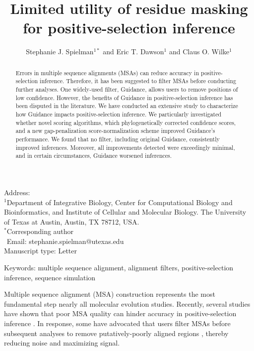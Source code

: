 \documentclass[11pt]{article}
\begin{document}
\title{\textbf{Limited utility of residue masking for positive-selection inference}}
\author{Stephanie J. Spielman$^{1*}$ and Eric T. Dawson$^{1}$ and Claus O. Wilke$^{1}$}
\date{}

\maketitle
\noindent
Address:\\
$^1$Department of Integrative Biology, Center for Computational Biology and Bioinformatics, and Institute of Cellular and Molecular Biology.
The University of Texas at Austin, Austin, TX 78712, USA.\\

\bigskip
\noindent
$^*$Corresponding author\\
$\phantom{^*}$Email: stephanie.spielman@utexas.edu\\

\bigskip
\noindent
Manuscript type: Letter

\bigskip
\noindent Keywords: multiple sequence alignment, alignment filters, positive-selection inference, sequence simulation

\newpage
\begin{abstract}
Errors in multiple sequence alignments (MSAs) can reduce accuracy in positive-selection inference. Therefore, it has been suggested to filter MSAs before conducting further analyses. One widely-used filter, Guidance, allows users to remove positions of low confidence. However, the benefits of Guidance in positive-selection inference has been disputed in the literature. We have conducted an extensive study to characterize how Guidance impacts positive-selection inference. We particularly investigated whether novel scoring algorithms, which phylogenetically corrected confidence scores, and a new gap-penalization score-normalization scheme improved Guidance's performance. We found that no filter, including original Guidance, consistently improved inferences. Moreover, all improvements detected were exceedingly minimal, and in certain circumstances, Guidance worsened inferences.
\end{abstract}

Multiple sequence alignment (MSA) construction represents the most fundamental step nearly all molecular evolution studies. Recently, several studies have shown that poor MSA quality can hinder accuracy in positive-selection inference \citep{Schneider2009, Fletcher2010, MarkovaRaina2011}. In response, some have advocated that users filter MSAs before subsequent analyses to remove putatively-poorly aligned regions \citep{Privman2012,Jordan2012}, thereby reducing noise and maximizing signal.
\end{document}
